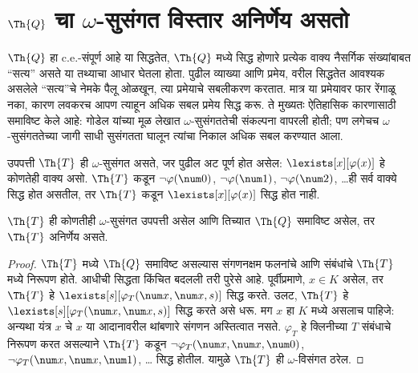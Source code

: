 \section[Q चा ओमेगा-सुसंगत विस्तार अनिर्णेय असतो]{$\Th{Q}$ चा $\omega$-सुसंगत विस्तार अनिर्णेय असतो}\label{inc:tcp:oqn:sec}

\begin{explain}
$\Th{Q}$ हा c.e.-संपूर्ण आहे या सिद्धतेत,
$\Th{Q}$ मध्ये सिद्ध होणारे प्रत्येक वाक्य नैसर्गिक संख्यांबाबत
``सत्य'' असते या तथ्याचा आधार घेतला होता. पुढील व्याख्या आणि
प्रमेय, वरील सिद्धतेत आवश्यक असलेले ``सत्य''चे नेमके पैलू
ओळखून, त्या प्रमेयाचे सबलीकरण करतात. मात्र या प्रमेयावर फार
रेंगाळू नका, कारण लवकरच आपण त्याहून अधिक सबल प्रमेय सिद्ध करू.
ते मुख्यतः ऐतिहासिक कारणासाठी समाविष्ट केले आहे: गोडेल यांच्या
मूळ लेखात $\omega$-सुसंगततेची संकल्पना वापरली होती; पण लगेचच
$\omega$-सुसंगततेच्या जागी साधी सुसंगतता घालून त्यांचा निकाल
अधिक सबल करण्यात आला.
\end{explain}

\begin{defn}
\label{inc:tcp:oqn:thm:oconsis-q}
उपपत्ती $\Th{T}$ ही $\omega$-सुसंगत असते, जर पुढील अट पूर्ण होत असेल:
$\lexists[x][\varphi(x)]$ हे कोणतेही वाक्य असो. $\Th{T}$ कडून
$\lnot \varphi(\num 0)$, $\lnot \varphi(\num 1)$,
$\lnot \varphi(\num 2)$, \dots ही सर्व वाक्ये सिद्ध होत असतील,
तर $\Th{T}$ कडून $\lexists[x][\varphi(x)]$ सिद्ध होत नाही.
\end{defn}

\begin{thm}
\label{inc:tcp:oqn:thm:oconsis-q-undec}
  $\Th{T}$ ही कोणतीही $\omega$-सुसंगत उपपत्ती असेल आणि तिच्यात
  $\Th{Q}$ समाविष्ट असेल, तर $\Th{T}$ अनिर्णेय असते.
\end{thm}

\begin{proof}
$\Th{T}$ मध्ये $\Th{Q}$ समाविष्ट असल्यास संगणनक्षम
फलनांचे आणि संबंधांचे $\Th{T}$ मध्ये निरूपण होते.
आधीची सिद्धता किंचित बदलली तरी पुरेसे आहे. पूर्वीप्रमाणे,
$x \in K$ असेल, तर $\Th{T}$ हे $\lexists[s][\varphi_T(\num
  x,\num x, s)]$ सिद्ध करते. उलट, $\Th{T}$ हे
$\lexists[s][\varphi_T(\num x, \num x, s)]$ सिद्ध करते असे धरू.
मग $x$ हा $K$ मध्ये असलाच पाहिजे: अन्यथा यंत्र $x$ चे
$x$ या आदानावरील थांबणारे संगणन अस्तित्वात नसते. $\varphi_T$ हे
क्लिनीच्या $T$ संबंधाचे निरूपण करत असल्याने $\Th{T}$ कडून
$\lnot \varphi_T(\num x, \num x, \num 0)$,
$\lnot \varphi_T(\num x, \num x, \num 1)$, \dots
सिद्ध होतील. यामुळे $\Th{T}$ ही $\omega$-विसंगत ठरेल.
\end{proof}












